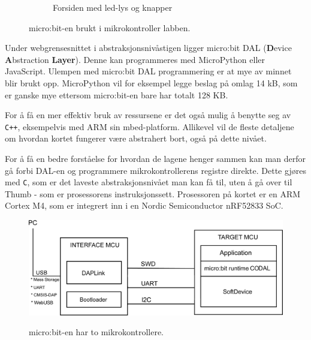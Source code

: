 \begin{alphasection}
\begin{figure}[H]
\begin{subfigure}{0.5\textwidth}
        \caption{Forsiden med led-lys og knapper}
        \label{fig:deform}
    \end{subfigure}
    \caption{micro:bit-en brukt i mikrokontroller labben.}
    \label{fig:micro:bit}
\end{figure}



Under webgrensesnittet i abstraksjonsnivåstigen ligger micro:bit {DAL} (\textbf{D}evice \textbf{A}bstraction \textbf{Layer}). Denne kan programmeres med MicroPython eller JavaScript. Ulempen med micro:bit DAL programmering er at mye av minnet blir brukt opp. MicroPython vil for eksempel legge beslag på omlag 14 kB, som er ganske mye ettersom micro:bit-en bare har totalt 128 KB.

For å få en mer effektiv bruk av ressursene er det også mulig å benytte seg av \verb|C++|, eksempelvis med ARM sin mbed-platform. Allikevel vil de fleste detaljene om hvordan kortet fungerer være abstrahert bort, også på dette nivået.

For å få en bedre forståelse for hvordan de lagene henger sammen kan man derfor gå forbi DAL-en og programmere mikrokontrollerens registre direkte. Dette gjøres med \verb|C|, som er det laveste abstraksjonsnivået man kan få til, uten å gå over til Thumb - som er prosessorens instruksjonssett. Prosessoren på kortet er en ARM Cortex M4, som er integrert inn i en Nordic Semiconductor nRF52833 SoC.

\begin{figure}[H]
    \centering
        \includegraphics[width=0.8\linewidth]{figures/microbit_interface.png}
        \label{fig:deform}
    \caption{micro:bit-en har to mikrokontrollere.}
    \label{fig:micro:bit-interface}
\end{figure}


\end{alphasection}

